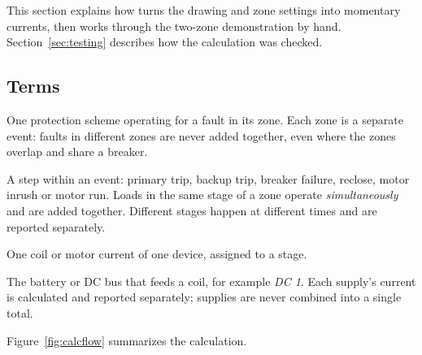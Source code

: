 This section explains how \app{} turns the drawing and zone settings into momentary
currents, then works through the two-zone demonstration by hand.
Section~\ref{sec:testing} describes how the calculation was checked.

\subsection{Terms}

\begin{description}[style=nextline, leftmargin=1.2em]
  \item[Zone (event)] One protection scheme operating for a fault in its zone. Each
    zone is a separate event: faults in different zones are never added together,
    even where the zones overlap and share a breaker.
  \item[Stage] A step within an event: primary trip, backup trip, breaker failure,
    reclose, motor inrush or motor run. Loads in the same stage of a zone operate
    \emph{simultaneously} and are added together. Different stages happen at different
    times and are reported separately.
  \item[Load] One coil or motor current of one device, assigned to a stage.
  \item[DC supply] The battery or DC bus that feeds a coil, for example \emph{DC 1}.
    Each supply's current is calculated and reported separately; supplies are never
    combined into a single total.
\end{description}

Figure~\ref{fig:calcflow} summarizes the calculation.

